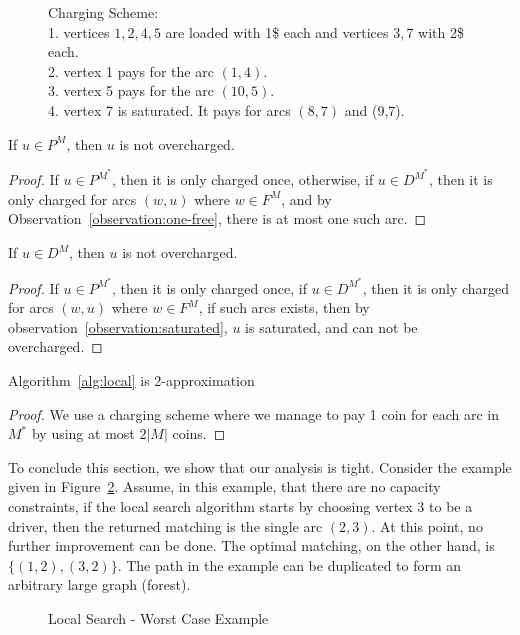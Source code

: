\begin{figure}
\centering
{}
\caption[]{
\label{fig:charging}
Charging Scheme:																	\\
1. vertices $1,2,4,5$ are loaded with 1\$ each and vertices $3,7$ with 2\$ each.	\\
2. vertex 1 pays for the arc $(1,4)$.												\\
3. vertex 5 pays for the arc $(10,5)$.												\\
4. vertex 7 is saturated. It pays for arcs $(8,7)$ and (9,7). 
}
\end{figure}

\begin{observation}
\label{observation:p-not-charged}
If $u \in P^M$, then $u$ is not overcharged.
\end{observation}

\begin{proof}
If $u \in P^{M^*}$, then it is only charged once, otherwise, 
if $u \in D^{M^*}$, then it is only charged for arcs $(w, u)$ where $w \in F^M$,
and by Observation~\ref{observation:one-free}, there is at most one such arc. 
\end{proof}

\begin{observation}
\label{observation:d-not-charged}
If $u \in D^M$, then $u$ is not overcharged.
\end{observation}

\begin{proof}
If $u \in P^{M^*}$, then it is only charged once, 
if $u \in D^{M^*}$, then it is only charged for arcs $(w, u)$ where $w \in F^M$,
if such arcs exists, then by observation~\ref{observation:saturated}, $u$ is saturated, 
and can not be overcharged.
\end{proof}

\begin{theorem}
Algorithm~\ref{alg:local} is 2-approximation
\end{theorem}

\begin{proof}
We use a charging scheme where we manage to pay 1 coin for each arc in $M^*$
by using at most $2|M|$ coins.
\end{proof}


To conclude this section, we show that our analysis is tight.
Consider the example given in Figure~\ref{fig:localtight}.
Assume, in this example, that there are no capacity constraints,
if the local search algorithm starts by choosing vertex $3$ to be a driver, 
then the returned matching is the single arc $(2,3)$.
At this point, no further improvement can be done.
The optimal matching, on the other hand, is $\{(1, 2), (3, 2)\}$. 
The path in the example can be duplicated to form an arbitrary large graph (forest).

\begin{figure} 
\caption{
\label{fig:localtight}
Local Search - Worst Case Example
}
\end{figure}